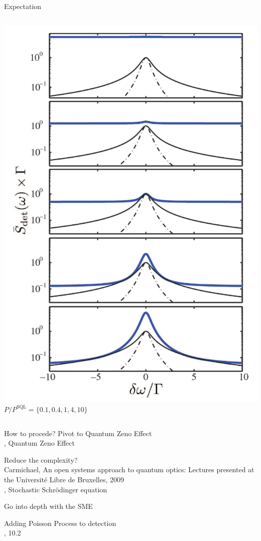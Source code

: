 \documentclass{beamer}
\begin{document}
\begin{frame}{Expectation}
\begin{columns}
		\small\centering
		\includegraphics[width=\textwidth]{figures/3.5.png}
		$P/P^\text{SQL} = \{0.1, 0.4, 1, 4, 10\}$
	\end{columns}
\end{frame}

\begin{frame}{How to procede?}
	Pivot to Quantum Zeno Effect\\
	{\tiny\cite{kramer_quantumopticsjl_2024}, Quantum Zeno Effect}

	Reduce the complexity?\\
	{\tiny Carmichael, An open systems approach to quantum optics: Lectures presented at the Université Libre de Bruxelles, 2009\\
	\cite{kramer_quantumopticsjl_2024}, Stochastic Schrödinger equation}

	\textcolor{seegrau}{Go into depth with the SME}
	
	\textcolor{seegrau}{
		Adding Poisson Process to detection\\
		{\tiny\cite{jacobs_straightforward_2006}, 10.2}
	}
\end{frame}


{
	\begin{frame}[plain]{}\end{frame}
}
\end{document}

